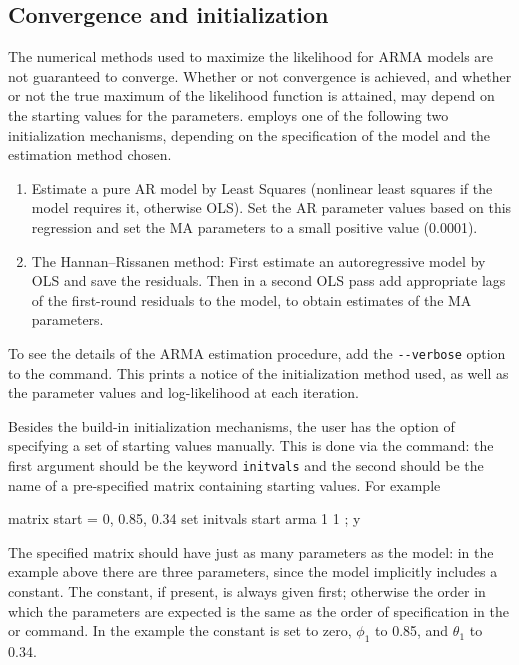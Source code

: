 \subsection{Convergence and initialization}

The numerical methods used to maximize the likelihood for ARMA models
are not guaranteed to converge.  Whether or not convergence is
achieved, and whether or not the true maximum of the likelihood
function is attained, may depend on the starting values for the
parameters.   employs one of the following two
initialization mechanisms, depending on the specification of the model
and the estimation method chosen.

\begin{enumerate}
\item Estimate a pure AR model by Least Squares (nonlinear least
  squares if the model requires it, otherwise OLS).  Set the AR
  parameter values based on this regression and set the MA
  parameters to a small positive value (0.0001).
\item The Hannan--Rissanen method: First estimate an autoregressive
  model by OLS and save the residuals.  Then in a second OLS pass add
  appropriate lags of the first-round residuals to the model, to
  obtain estimates of the MA parameters.
\end{enumerate}

To see the details of the ARMA estimation procedure, add the
\verb|--verbose| option to the command.  This prints a notice of the
initialization method used, as well as the parameter values and
log-likelihood at each iteration.

Besides the build-in initialization mechanisms, the user has the
option of specifying a set of starting values manually.  This is done
via the  command: the first argument should be the keyword
\texttt{initvals} and the second should be the name of a pre-specified
matrix containing starting values.  For example
\begin{code}
  matrix start = { 0, 0.85, 0.34 }
  set initvals start
  arma 1 1 ; y
\end{code}
The specified matrix should have just as many parameters as the model:
in the example above there are three parameters, since the model
implicitly includes a constant.  The constant, if present, is always
given first; otherwise the order in which the parameters are
expected is the same as the order of specification in the 
or  command.  In the example the constant is set to zero,
$\phi_1$ to 0.85, and $\theta_1$ to 0.34.


